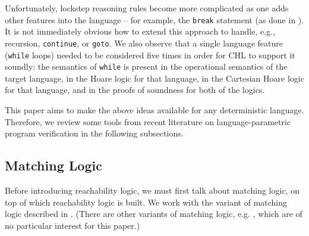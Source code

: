 Unfortunately, lockstep reasoning rules become more complicated as one adds other features into the language
-- for example, the \texttt{break} statement (as done in \cite{SousaD16}).
It is not immediately obvious how to extend this approach to handle, e.g., recursion, \texttt{continue}, or \texttt{goto}.
We also observe that a single language feature (\texttt{while} loops) needed to be considered five times
in order for CHL to support it soundly: the semantics of \texttt{while} is present in the operational semantics of
the target language, in the Hoare logic for that language, in the Cartesian Hoare logic for that language,
and in the proofs of soundness for both of the logics.

This paper aims to make the above ideas available for any deterministic language.
Therefore, we review some tools from recent literature
on language-parametric program verification in the following subsections.

\subsection{Matching Logic}

Before introducing reachability logic, we must first talk about matching
logic, on top of which reachability logic is built. We work with the variant of matching logic described in
\cite{StefanescuCMMSR19, RosuSCM13lics}. (There are other variants of matching
logic, e.g. \cite{MmL, MLexplained}, which are of no particular interest for this paper.)





